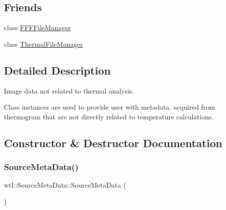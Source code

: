 \subsection*{Friends}
\begin{DoxyCompactItemize}
\item 
class \hyperlink{classwtl_1_1_source_meta_data_a89f52b56f7155da8da3c26ad5feb1bcc}{F\+F\+F\+File\+Manager}
\item 
class \hyperlink{classwtl_1_1_source_meta_data_a7d99a404a557c5e4244a8c6ec26e7648}{Thermal\+File\+Manager}
\end{DoxyCompactItemize}


\subsection{Detailed Description}
Image data not related to thermal analysis. 

Class instances are used to provide user with metadata. acquired from thermogram that are not directly related to temperature calculations. 

\subsection{Constructor \& Destructor Documentation}
\mbox{\label{classwtl_1_1_source_meta_data_a79f846523696923b9e7d62fab52fb96c}} 
\subsubsection{\texorpdfstring{Source\+Meta\+Data()}{SourceMetaData()}\hspace{0.1cm}{\footnotesize\ttfamily [1/2]}}
{\footnotesize\ttfamily wtl\+::\+Source\+Meta\+Data\+::\+Source\+Meta\+Data (\begin{DoxyParamCaption}{ }\end{DoxyParamCaption})}

\mbox{\label{classwtl_1_1_source_meta_data_acc7b69f117a62e3379c72584597d2d8d}} 
